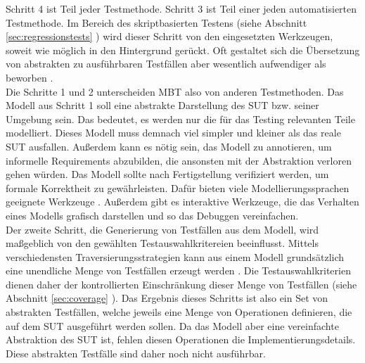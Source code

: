 Schritt 4 ist Teil jeder Testmethode. Schritt 3 ist Teil einer jeden automatisierten Testmethode. Im Bereich des skriptbasierten Testens (siehe Abschnitt \ref{sec:regressionstests} ) wird dieser Schritt von den eingesetzten Werkzeugen, soweit wie möglich in den Hintergrund gerückt. Oft gestaltet sich die Übersetzung von abstrakten zu ausführbaren Testfällen aber wesentlich aufwendiger als beworben \cite{graham_experiences_2012}.\\
Die Schritte 1 und 2 unterscheiden \Gls{MBT} also von anderen Testmethoden. Das Modell aus Schritt 1 soll eine abstrakte Darstellung des \Gls{SUT} bzw. seiner Umgebung sein. Das bedeutet, es werden nur die für das Testing relevanten Teile modelliert. Dieses Modell muss demnach viel simpler und kleiner als das reale \Gls{SUT} ausfallen. Außerdem kann es nötig sein, das Modell zu annotieren, um informelle Requirements abzubilden, die ansonsten mit der Abstraktion verloren gehen würden. Das Modell sollte nach Fertigstellung verifiziert werden, um formale Korrektheit zu gewährleisten. Dafür bieten viele Modellierungssprachen geeignete Werkzeuge \cite{kaneiwa_consistency_2006}. Außerdem gibt es interaktive Werkzeuge, die das Verhalten eines Modells grafisch darstellen und so das Debuggen vereinfachen.\\
Der zweite Schritt, die Generierung von Testfällen aus dem Modell, wird maßgeblich von den gewählten Testauswahlkritereien beeinflusst. Mittels verschiedensten Traversierungsstrategien kann aus einem Modell grundsätzlich eine unendliche Menge von Testfällen erzeugt werden \cite{utting_practical_2007}. Die Testauswahlkriterien dienen daher der kontrollierten Einschränkung dieser Menge von Testfällen (siehe Abschnitt \ref{sec:coverage} ). Das Ergebnis dieses Schritts ist also ein Set von abstrakten Testfällen, welche jeweils eine Menge von Operationen definieren, die auf dem \Gls{SUT} ausgeführt werden sollen. Da das Modell aber eine vereinfachte Abstraktion des \Gls{SUT} ist, fehlen diesen Operationen die Implementierungsdetails. Diese abstrakten Testfälle sind daher noch nicht ausführbar.\\
